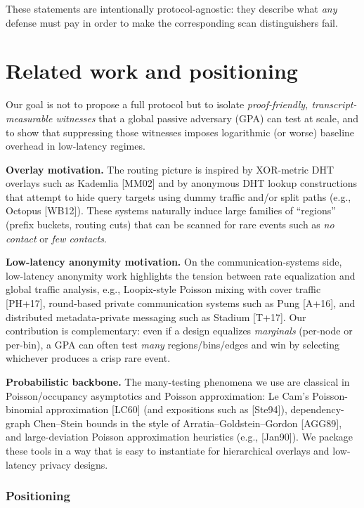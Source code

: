 \documentclass[
 11pt,
]{article}
\begin{document}
These statements are intentionally protocol-agnostic: they describe what \emph{any} defense must
pay in order to make the corresponding scan distinguishers fail.

\section{Related work and
positioning}\label{related-work-and-positioning}

Our goal is not to propose a full protocol but to isolate
\emph{proof-friendly, transcript-measurable witnesses} that a global
passive adversary (GPA) can test at scale, and to show that suppressing
those witnesses imposes logarithmic (or worse) baseline overhead in
low-latency regimes.

\textbf{Overlay motivation.} The routing picture is inspired by
XOR-metric DHT overlays such as Kademlia {[}MM02{]} and by anonymous DHT
lookup constructions that attempt to hide query targets using dummy
traffic and/or split paths (e.g., Octopus {[}WB12{]}). These systems
naturally induce large families of ``regions'' (prefix buckets, routing
cuts) that can be scanned for rare events such as \emph{no contact} or
\emph{few contacts}.

\textbf{Low-latency anonymity motivation.} On the communication-systems
side, low-latency anonymity work highlights the tension between rate
equalization and global traffic analysis, e.g., Loopix-style Poisson
mixing with cover traffic {[}PH+17{]}, round-based private communication
systems such as Pung {[}A+16{]}, and distributed metadata-private
messaging such as Stadium {[}T+17{]}. Our contribution is complementary:
even if a design equalizes \emph{marginals} (per-node or per-bin), a GPA
can often test \emph{many} regions/bins/edges and win by selecting
whichever produces a crisp rare event.

\textbf{Probabilistic backbone.} The many-testing phenomena we use are
classical in Poisson/occupancy asymptotics and Poisson approximation: Le
Cam's Poisson-binomial approximation {[}LC60{]} (and expositions such as
{[}Ste94{]}), dependency-graph Chen--Stein bounds in the style of
Arratia--Goldstein--Gordon {[}AGG89{]}, and large-deviation Poisson
approximation heuristics (e.g., {[}Jan90{]}). We package these tools in
a way that is easy to instantiate for hierarchical overlays and
low-latency privacy designs.

\subsubsection{Positioning}\label{positioning}
\end{document}
